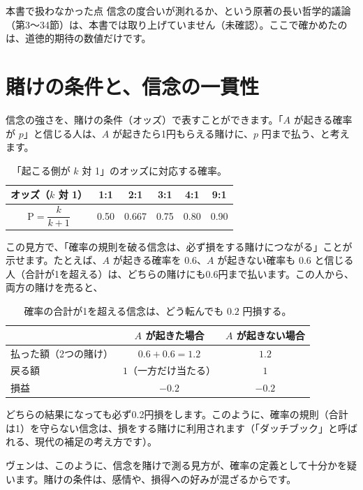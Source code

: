 \documentclass[a4paper,11pt,openany]{ltjsbook}
\newcommand{\Prob}{\mathrm{P}}
\begin{document}
\begin{notebox}{本書で扱わなかった点}
信念の度合いが測れるか、という原著の長い哲学的議論（第3〜34節）は、本書では取り上げていません（未確認）。ここで確かめたのは、道徳的期待の数値だけです。
\end{notebox}

\section{賭けの条件と、信念の一貫性}

信念の強さを、賭けの条件（オッズ）で表すことができます。「$A$ が起きる確率が $p$」と信じる人は、$A$ が起きたら1円もらえる賭けに、$p$ 円まで払う、と考えます。

\begin{table}[htbp]
\centering
\begin{tabular}{c|ccccc}
\toprule
オッズ（$k$ 対 1） & 1:1 & 2:1 & 3:1 & 4:1 & 9:1\\
\midrule
$\Prob=\dfrac{k}{k+1}$ & 0.50 & 0.667 & 0.75 & 0.80 & 0.90\\
\bottomrule
\end{tabular}
\caption{「起こる側が $k$ 対 1」のオッズに対応する確率。}
\end{table}

この見方で、「確率の規則を破る信念は、必ず損をする賭けにつながる」ことが示せます。たとえば、$A$ が起きる確率を $0.6$、$A$ が起きない確率も $0.6$ と信じる人（合計が1を超える）は、どちらの賭けにも0.6円まで払います。この人から、両方の賭けを売ると、

\begin{table}[htbp]
\centering
\begin{tabular}{lcc}
\toprule
 & $A$ が起きた場合 & $A$ が起きない場合\\
\midrule
払った額（2つの賭け） & $0.6+0.6=1.2$ & $1.2$\\
戻る額 & $1$（一方だけ当たる） & $1$\\
損益 & $-0.2$ & $-0.2$\\
\bottomrule
\end{tabular}
\caption{確率の合計が1を超える信念は、どう転んでも $0.2$ 円損する。}
\end{table}

どちらの結果になっても必ず0.2円損をします。このように、確率の規則（合計は1）を守らない信念は、損をする賭けに利用されます（「ダッチブック」と呼ばれる、現代の補足の考え方です）。

ヴェンは、このように、信念を賭けで測る見方が、確率の定義として十分かを疑います。賭けの条件は、感情や、損得への好みが混ざるからです。
\end{document}
